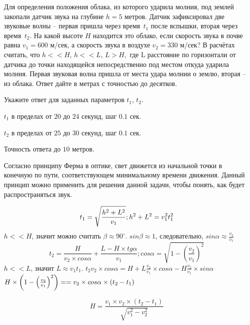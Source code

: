 
Для определения положения облака, из которого ударила
молния, под землей закопали датчик звука на глубине $h=5$ метров. Датчик 
зафиксировал две звуковые волны – первая пришла через время~$t_1$ после
вспышки, вторая через время~$t_2$. На какой
высоте $H$ находится это облако,
если скорость звука в почве равна \linebreak $v_1 = 600$ м/сек, а скорость
звука в воздухе $v_2 = 330$ м/сек? В расчётах
считать, что $h << H$, $h << L$, $L >  H$, где L расстояние по горизонтали от датчика до точки находящейся непосредственно под местом откуда ударила молния. Первая
звуковая волна пришла от места удара молнии о землю, вторая – из облака. Ответ дайте в метрах с точностью до десятков.


Укажите ответ для заданных параметров $ t_1$, $t_2$.

\paramSection

$t_1$ в пределах от $20$ до $24$ секунд, шаг  $0.1$ сек.  

$t_2$ в пределах от $25$ до $30$ секунд, шаг  $0.1$ сек.

Точность ответа  до $10$ метров.

\solutionSection

Согласно принципу Ферма в оптике, свет движется из начальной точки в конечную по пути, 
соответствующем минимальному времени движения. Данный принцип можно применить для решения данной задачи, 
чтобы понять, как будет распространяться звук.

$$t_1=\sqrt{\frac{h^2+L^2}{v_1}}; \space h^2+L^2=v_1^2 t_1^2$$
$h<<H$, значит можно считать $\beta  \approx 90^{\circ}$. $sin\beta  \approx 1$, следовательно,  
$sin \alpha  \approx \frac{v_2}{v_1}$ 
$$t_2=\frac{H}{v_2  \times cos \alpha}+\frac{L-H \times tg \alpha }{v_1}; 
cos \alpha =\sqrt{1-\left(\frac{v_2}{v_1}\right)^2}$$
$h<<L$, значит $L \approx v_1 t_1$. $t_2 v_2 \times cos \alpha =H+L \frac{v_2}{v_1} \times cos \alpha -H \frac{v_2}{v_1} \times sin \alpha$  
$H \times \left(1-\left(\frac{v_2}{v_1} \right)^2 \right)= \linebreak = v_2 \times cos \alpha  \times (t_2-t_1 )$

$$H=\frac{v_1 \times v_2 \times (t_2-t_1 )}{\sqrt{v_1^2-v_2^2}}$$

